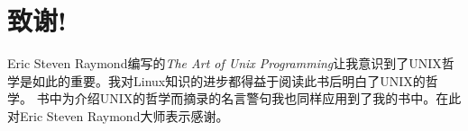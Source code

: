 \thispagestyle{empty}
\chapter*{致谢!}

Eric Steven Raymond编写的\textit{The Art of Unix Programming}让我意识到了UNIX哲学是如此的重要。我对Linux知识的进步都得益于阅读此书后明白了UNIX的哲学。
书中为介绍UNIX的哲学而摘录的名言警句我也同样应用到了我的书中。在此对Eric Steven Raymond大师表示感谢。

\newpage\thispagestyle{empty}